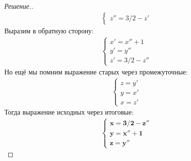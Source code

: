 \documentclass[a4paper]{article}
\theoremstyle{remark}
\begin{document}
\begin{proof}[Решение.]
\begin{align*}
\begin{cases}
            z'' = 3/2 - z'
          \end{cases}
        \end{align*}
        Выразим в обратную сторону:
        \begin{align*}
          \begin{cases}
            x' = x'' + 1 \\
            y' = y'' \\
            z' = 3/2 - z''
          \end{cases}
        \end{align*}
        Но ещё мы помним выражение старых через промежуточные:
        \begin{align*}
          \begin{cases}
            z = y' \\
            y = x' \\
            x = z'
          \end{cases}
        \end{align*}
        Тогда выражение исходных через итоговые:
        \begin{align*}
          \begin{cases}
            \bm{x = 3/2 - z''} \\
            \bm{y = x'' + 1} \\
            \bm{z = y''}
          \end{cases}
        \end{align*}        
        \end{proof}

\end{document}
